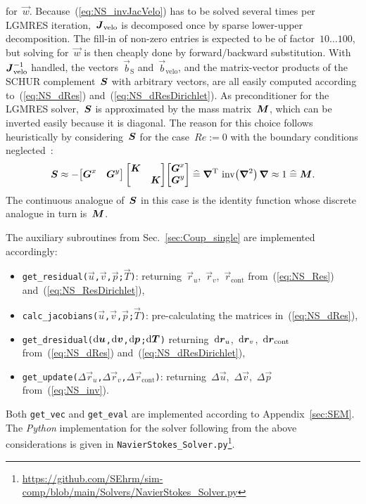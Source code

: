 \documentclass[10pt, ngerman, english,
twoside, open=right,
numbers=noenddot,
declaration=section,
abstract=section,
abstract=multiple,
abstract=notoc,
declaration=notoc,
cd=pale, 
chapterprefix=off, 
chapterpage=false, 
headingsvskip=-10em,
cdgeometry=custom, 
slantedgreek=on,
cdmath=on, 
cdfont=on,
ttfont=false,
mathswap=off,
]{tudscrreprt}
\numberwithin{equation}{chapter}
\renewcommand{\textsc}[1]{\uppercase{\mbox{#1}}}
\newcommand{\sidenote}[1]{
  \leavevmode %
  \marginpar{\hyphenpenalty=1000 \flushleft{\textcolor{HKS41}{#1}}}}
\begin{document}
for~$\vec{w}$. 
Because~(\ref{eq:NS_invJacVelo}) has to be solved several times per LGMRES iteration,~$\boldsymbol{J}_\text{velo}$ is decomposed once by sparse lower-upper decomposition. The fill-in of non-zero entries is expected to be of factor~$10\ldots100$, but solving for~$\vec{w}$ is then cheaply done by forward/backward substitution.
With~$\boldsymbol{J}_\text{velo}^{-1}$ handled, the vectors~$\vec{b}_\text{S}$ and~$\vec{b}_\text{velo}$, and the matrix-vector products of the \textsc{Schur} complement~$\boldsymbol{S}$ with arbitrary vectors, are all easily computed according to~(\ref{eq:NS_dRes}) and~(\ref{eq:NS_dResDirichlet}). As preconditioner for the LGMRES solver,~$\boldsymbol{S}$ is approximated by the mass matrix~$\boldsymbol{M}$, which can be inverted easily because it is diagonal. The reason for this choice follows heuristically by considering~$\boldsymbol{S}$ for the case~$Re:=0$ with the boundary conditions neglected~\cite[see][405]{KarniadakisSpencer}:
\[
\mat S \approx - \begin{bmatrix} \mat G^x & \mat G^y \end{bmatrix}\,
\begin{bmatrix}
\mat K & \\ & \mat K
\end{bmatrix}
\begin{bmatrix} \mat G^x \\ \mat G^y \end{bmatrix} \mathrel{\widehat{=}} \del^\T\, \operatorname{inv}\left( \laplace \right)\, \del \approx 1 \mathrel{\widehat{=}} \mat M\text{.}
\]
The continuous analogue of~$\boldsymbol{S}$ in this case is the identity function whose discrete analogue in turn is~$\boldsymbol{M}$.\par
\sidenote{Implementation}The auxiliary subroutines from Sec.~\ref{sec:Coup_single} are implemented accordingly:
\begin{itemize}
\item \texttt{get\_residual($\vec{u}$,$\vec{v}$,$\vec{p}$;$\vec{T}$)}: returning~$\vec{r}_u$,~$\vec{r}_v$,~$\vec{r}_\text{cont}$ from~(\ref{eq:NS_Res}) and~(\ref{eq:NS_ResDirichlet}),
\item \texttt{calc\_jacobians($\vec{u}$,$\vec{v}$,$\vec{p}$;$\vec{T}$)}: pre-calculating the matrices in~(\ref{eq:NS_dRes}),
\item \texttt{get\_dresidual($\mathrm{d}\boldsymbol{u}$,$\mathrm{d}\boldsymbol{v}$,$\mathrm{d}\boldsymbol{p}$;$\mathrm{d}\boldsymbol{T}$)} returning~$\mathrm{d}\boldsymbol{r}_u$,~$\mathrm{d}\boldsymbol{r}_v$,~$\mathrm{d}\boldsymbol{r}_\text{cont}$ from~(\ref{eq:NS_dRes}) and~(\ref{eq:NS_dResDirichlet}),
\item \texttt{get\_update($\Delta\vec{r}_u$,$\Delta\vec{r}_v$,$\Delta\vec{r}_\text{cont}$)}: returning~$\Delta\vec{u}$,~$\Delta\vec{v}$,~$\Delta\vec{p}$ from~(\ref{eq:NS_inv}).
\end{itemize}
Both \texttt{get\_vec} and \texttt{get\_eval} are implemented according to Appendix~\ref{sec:SEM}. The \textit{Python} implementation for the solver following from the above considerations is given in \texttt{NavierStokes\_Solver.py}\footnote{\url{https://github.com/SEhrm/sim-comp/blob/main/Solvers/NavierStokes_Solver.py}}.
\end{document}
